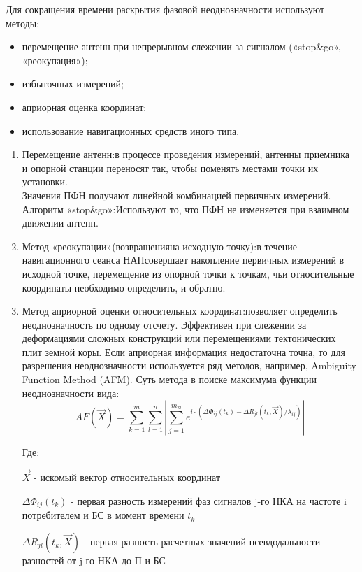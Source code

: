 \documentclass[14pt,a4paper,oneside]{extarticle}
\begin{document}
Для сокращения времени раскрытия фазовой неоднозначности используют методы:

\begin{itemize}
    \item перемещение антенн при непрерывном слежении за сигналом («stop\&go», «реокупация»);
    \item избыточных измерений;
    \item априорная оценка координат;
    \item использование навигационных средств иного типа.
\end{itemize}

\begin{enumerate}
    \item Перемещение антенн:в процессе проведения измерений, антенны приемника и опорной станции переносят так, чтобы поменять местами точки их установки.\\
          Значения ПФН получают линейной комбинацией первичных измерений.\\
          Алгоритм «stop\&go»:Используют то, что ПФН не изменяется при взаимном движении антенн.
    \item Метод «реокупации»(возвращенияна исходную точку):в течение навигационного сеанса НАПсовершает накопление первичных измерений в исходной точке, перемещение из опорной точки к точкам, чьи относительные координаты необходимо определить, и обратно.
    \item Метод априорной оценки относительных координат:позволяет определить неоднозначность по одному отсчету. Эффективен при слежении за деформациями сложных конструкций или перемещениями тектонических плит земной коры. Если априорная информация недостаточна точна, то для разрешения неоднозначности используется ряд методов, например, Ambiguity Function Method (AFM). Суть метода в поиске максимума функции неоднозначности вида: \[AF(\vec{X})=\sum_{k=1}^{m}\sum_{l=1}^{n}\left|\sum_{j=1}^{m_{kl}}e^{i\cdot\left(\Delta\Phi_{ij}(t_k)-\Delta R_{jl}(t_k,\vec{X})/\lambda_{ij}\right)}\right|\] 
    
    Где:

    $\vec{X}$ - искомый вектор относительных координат

    $\Delta\Phi_{ij}(t_k)$ - первая разность измерений фаз сигналов j-го НКА на частоте i потребителем и БС в момент времени $t_k$

    $\Delta R_{jl}(t_k,\vec{X})$ - первая разность расчетных значений псевдодальности разностей от j-го НКА до П и БС


\end{enumerate}
\end{document}
